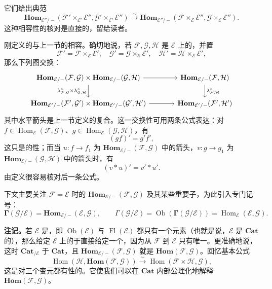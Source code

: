 它们给出典范
\[
 \mathbf{Hom}_{\mathcal E''/-}(\mathcal F'\times_{\mathcal E'}\mathcal E'',\mathcal G'\times_{\mathcal E'}\mathcal E'')
 \xrightarrow{\sim}\mathbf{Hom}_{\mathcal E''/-}(\mathcal F\times_{\mathcal E}\mathcal E'',\mathcal G\times_{\mathcal E}\mathcal E'').
\]
这种相容性的核对是直接的，留给读者。

刚定义的与上一节的相容。确切地说，若 $\mathcal F,\mathcal G,\mathcal H$ 是 $\mathcal E$ 上的，并置
\[
 \mathcal F'=\mathcal F\times_{\mathcal E}\mathcal E',\quad
 \mathcal G'=\mathcal G\times_{\mathcal E}\mathcal E',\quad
 \mathcal H'=\mathcal H\times_{\mathcal E}\mathcal E',
\]
那么下列图交换：
\[
\begin{tikzcd}[column sep=large]
\mathbf{Hom}_{\mathcal E/-}(\mathcal F,\mathcal G)\times\mathbf{Hom}_{\mathcal E/-}(\mathcal G,\mathcal H)
 \arrow[r]\arrow[d,"{\lambda^*_{\mathcal F,\mathcal G}\times\lambda^*_{\mathcal G,\mathcal H}}"']&
\mathbf{Hom}_{\mathcal E/-}(\mathcal F,\mathcal H)\arrow[d,"{\lambda^*_{\mathcal F,\mathcal H}}"]\\
\mathbf{Hom}_{\mathcal E'/-}(\mathcal F',\mathcal G')\times\mathbf{Hom}_{\mathcal E'/-}(\mathcal G',\mathcal H')
 \arrow[r]&\mathbf{Hom}_{\mathcal E'/-}(\mathcal F',\mathcal H')
\end{tikzcd}
\]
其中水平箭头是上一节定义的复合。这一交换性可用两条公式表达：对 $f\in\operatorname{Hom}_{\mathcal E}(\mathcal F,\mathcal G)$、$g\in\operatorname{Hom}_{\mathcal E}(\mathcal G,\mathcal H)$，有
\[
 (gf)'=g'f',
\]
这只是的性；而当 $u:f\to f_1$ 为 $\mathbf{Hom}_{\mathcal E/-}(\mathcal F,\mathcal G)$ 中的箭头，$v:g\to g_1$ 为 $\mathbf{Hom}_{\mathcal E/-}(\mathcal G,\mathcal H)$ 中的箭头时，有
\[
 (v*u)'=v'*u'.
\]
由定义很容易核对后一条公式。

下文主要关注 $\mathcal F=\mathcal E$ 时的 $\mathbf{Hom}_{\mathcal E/-}(\mathcal F,\mathcal G)$ 及其某些重要子，为此引入专门记号：
\[
 \boldsymbol\Gamma(\mathcal G/\mathcal E)=\mathbf{Hom}_{\mathcal E/-}(\mathcal E,\mathcal G),\qquad
 \Gamma(\mathcal G/\mathcal E)=\operatorname{Ob}(\boldsymbol\Gamma(\mathcal G/\mathcal E))
 =\operatorname{Hom}_{\mathcal E}(\mathcal E,\mathcal G).
\]

\textbf{注记。}若 $\mathcal E$ 是，即 $\operatorname{Ob}(\mathcal E)$ 与 $\operatorname{Fl}(\mathcal E)$ 都只有一个元素（也就是说，$\mathcal E$ 是 $\mathbf{Cat}$ 的），那么给定 $\mathcal E$ 上的于直接给定一个，因为从 $\mathcal F$ 到 $\mathcal E$ 只有唯一。更准确地说，这时 $\mathbf{Cat}_{/\mathcal E}$ 于 $\mathbf{Cat}$，且 $\mathbf{Hom}_{\mathcal E/-}(\mathcal F,\mathcal G)$ 就是 $\mathbf{Hom}(\mathcal F,\mathcal G)$。回忆基本公式
\[
 \operatorname{Hom}(\mathcal H,\mathbf{Hom}(\mathcal F,\mathcal G))
 \xrightarrow{\sim}\operatorname{Hom}(\mathcal F\times\mathcal H,\mathcal G),
\]
这是对三个变元都有性的。它使我们可以在 $\mathbf{Cat}$ 内部公理化地解释 $\mathbf{Hom}(\mathcal F,\mathcal G)$。

